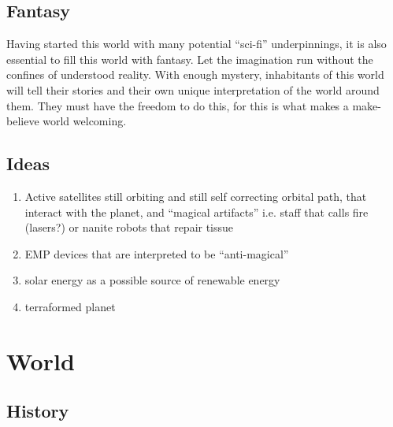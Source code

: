 \documentclass[11pt]{article}
\begin{document}
\subsection{Fantasy}
\label{sec:org50779a3}
Having started this world with many potential ``sci-fi'' underpinnings, it is also essential to fill this world with fantasy. Let the imagination run without the confines of understood reality. With enough mystery, inhabitants of this world will tell their stories and their own unique interpretation of the world around them. They must have the freedom to do this, for this is what makes a make-believe world welcoming.

\subsection{Ideas}
\label{sec:org95679af}
\begin{enumerate}
\item Active satellites still orbiting and still self correcting orbital path, that interact with the planet, and ``magical artifacts'' i.e. staff that calls fire (lasers?) or nanite robots that repair tissue
\item EMP devices that are interpreted to be ``anti-magical''
\item solar energy as a possible source of renewable energy
\item terraformed planet
\end{enumerate}
\section{World}
\label{sec:orgd3599e8}
\subsection{History}
\label{sec:orgee0e5e1}
\end{document}
